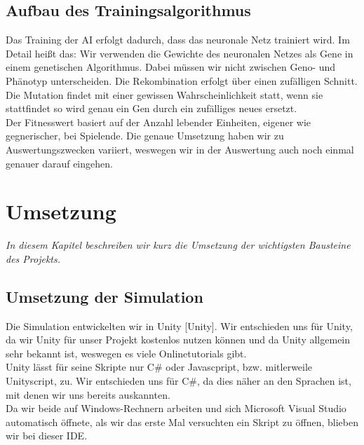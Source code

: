 \documentclass[
	12pt,
	a4paper,
	BCOR10mm,
	DIV14,
	headsepline,
	usegeometry,
]{scrreprt}
\begin{document}
\section{Aufbau des Trainingsalgorithmus}
Das Training der AI erfolgt dadurch, dass das neuronale Netz trainiert wird. Im Detail heißt das: Wir verwenden die Gewichte des neuronalen Netzes als Gene in einem genetischen Algorithmus. Dabei müssen wir nicht zwischen Geno- und Phänotyp unterscheiden. Die Rekombination erfolgt über einen zufälligen Schnitt. Die Mutation findet mit einer gewissen Wahrscheinlichkeit statt, wenn sie stattfindet so wird genau ein Gen durch ein zufälliges neues ersetzt.\\
Der Fitnesswert basiert auf der Anzahl lebender Einheiten, eigener wie gegnerischer, bei Spielende. Die genaue Umsetzung haben wir zu Auswertungszwecken variiert, weswegen wir in der Auswertung auch noch einmal genauer darauf eingehen.

\chapter{Umsetzung}
\label{Umsetzung}

\textit{%
In diesem Kapitel beschreiben wir kurz die Umsetzung der wichtigsten Bausteine des Projekts.
}

\bigskip

\section{Umsetzung der Simulation}
Die Simulation entwickelten wir in Unity [Unity]. Wir entschieden uns für Unity, da wir Unity für unser Projekt kostenlos nutzen können und da Unity allgemein sehr bekannt ist, weswegen es viele Onlinetutorials gibt.\\
Unity lässt für seine Skripte nur C\# oder Javascpript, bzw. mitlerweile Unityscript, zu. Wir entschieden uns für C\#, da dies näher an den Sprachen ist, mit denen wir uns bereits auskannten.\\
Da wir beide auf Windows-Rechnern arbeiten und sich Microsoft Visual Studio automatisch öffnete, als wir das erste Mal versuchten ein Skript zu öffnen, blieben wir bei dieser IDE.
\end{document}
